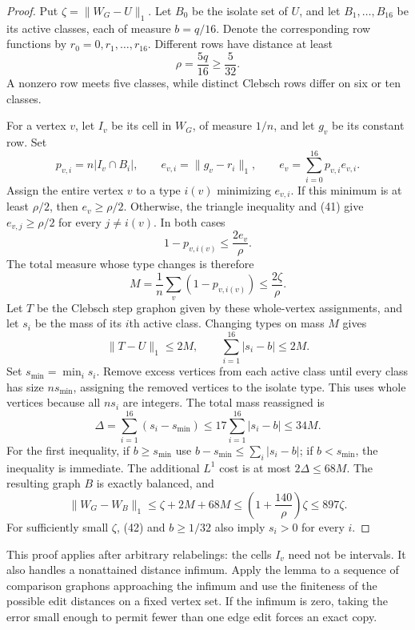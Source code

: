\documentclass[11pt]{amsart}
\theoremstyle{definition}
\theoremstyle{remark}
\begin{document}
\begin{proof}
Put $\zeta=\|W_G-U\|_1$. Let $B_0$ be the isolate set of $U$, and let
$B_1,\ldots,B_{16}$ be its active classes, each of measure $b=q/16$.
Denote the corresponding row functions by $r_0=0,r_1,\ldots,r_{16}$.
Different rows have distance at least
\begin{equation}\tag{41}\label{eq:41}
 \rho=\frac{5q}{16}\geq\frac5{32}.
\end{equation}
A nonzero row meets five classes, while distinct Clebsch rows differ on six
or ten classes.

For a vertex $v$, let $I_v$ be its cell in $W_G$, of measure $1/n$, and let
$g_v$ be its constant row. Set
\[
 p_{v,i}=n|I_v\cap B_i|,\qquad
 e_{v,i}=\|g_v-r_i\|_1,\qquad
 e_v=\sum_{i=0}^{16}p_{v,i}e_{v,i}.
\]
Assign the entire vertex $v$ to a type $i(v)$ minimizing $e_{v,i}$. If this
minimum is at least $\rho/2$, then $e_v\geq\rho/2$. Otherwise, the triangle
inequality and (41) give $e_{v,j}\geq\rho/2$ for every $j\ne i(v)$. In both
cases
\[
 1-p_{v,i(v)}\leq\frac{2e_v}{\rho}.
\]
The total measure whose type changes is therefore
\begin{equation}\tag{42}\label{eq:42}
 M=\frac1n\sum_v(1-p_{v,i(v)})\leq\frac{2\zeta}{\rho}.
\end{equation}
Let $T$ be the Clebsch step graphon given by these whole-vertex assignments,
and let $s_i$ be the mass of its $i$th active class. Changing types on mass
$M$ gives
\[
 \|T-U\|_1\leq2M,\qquad\sum_{i=1}^{16}|s_i-b|\leq2M.
\]
Set $s_{\min}=\min_i s_i$. Remove excess vertices from each active class
until every class has size $ns_{\min}$, assigning the removed vertices to
the isolate type. This uses whole vertices because all $ns_i$ are integers.
The total mass reassigned is
\[
 \Delta=\sum_{i=1}^{16}(s_i-s_{\min})
 \leq17\sum_{i=1}^{16}|s_i-b|\leq34M.
\]
For the first inequality, if $b\geq s_{\min}$ use
$b-s_{\min}\leq\sum_i|s_i-b|$; if $b<s_{\min}$, the inequality is immediate.
The additional $L^1$ cost is at most $2\Delta\leq68M$. The resulting graph
$B$ is exactly balanced, and
\[
 \|W_G-W_B\|_1\leq\zeta+2M+68M
 \leq\left(1+\frac{140}{\rho}\right)\zeta\leq897\zeta.
\]
For sufficiently small $\zeta$, (42) and $b\geq1/32$ also imply $s_i>0$
for every $i$.
\end{proof}

This proof applies after arbitrary relabelings: the cells $I_v$ need not be
intervals. It also handles a nonattained distance infimum. Apply the lemma
to a sequence of comparison graphons approaching the infimum and use the
finiteness of the possible edit distances on a fixed vertex set. If the
infimum is zero, taking the error small enough to permit fewer than one
edge edit forces an exact copy.
\end{document}

